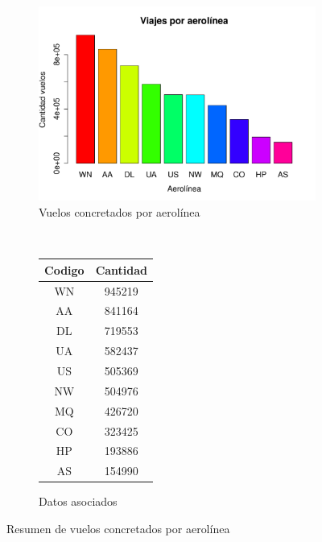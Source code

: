 \documentclass[12pt]{article}
\numberwithin{equation}{section}
\numberwithin{table}{section}
\numberwithin{figure}{section}
\begin{document}
\begin{figure}
        \centering
        ~
        \begin{subfigure}[b]{0.6\textwidth}
                \includegraphics[width=1\columnwidth]{imagenes/completos/viajes-por-aerolinea}
                \caption{Vuelos concretados por aerolínea}
        \end{subfigure}
        ~
        \begin{subfigure}[b]{0.3\textwidth}
\begin{tabular}{@{}cc@{}}
\toprule
\textbf{Codigo} & \textbf{Cantidad} \\ \midrule
WN              & 945219            \\
AA              & 841164            \\
DL              & 719553            \\
UA              & 582437            \\
US              & 505369            \\
NW              & 504976            \\
MQ              & 426720            \\
CO              & 323425            \\
HP              & 193886            \\
AS              & 154990            \\ \bottomrule
\end{tabular}
                \caption{Datos asociados}
        \end{subfigure}
        \caption{Resumen de vuelos concretados por aerolínea}
        \label{fig:concretados-por-aerolinea}
\end{figure}
\end{document}
